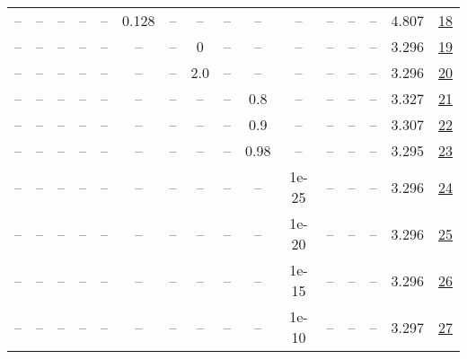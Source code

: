 \begin{table}[H]
\begin{tabular}{cccccccccccccccc}
-- & -- & -- & -- & -- & 0.128 & -- & -- & -- & -- & -- & -- & -- & -- & 4.807 & \href{https://wandb.ai/stanford-mercury/optimizer-scaling/runs/sweep-130m-10B-muonzc9fa46lr0.128-wd0.1-minlr0-warmup0-b10.8-b20-d85c56}{18} \\
-- & -- & -- & -- & -- & -- & -- & 0 & -- & -- & -- & -- & -- & -- & 3.296 & \href{https://wandb.ai/stanford-mercury/optimizer-scaling/runs/sweep-130m-10B-muonz9a2aablr0.008-wd0.1-minlr0-warmup0-b10.8-b20-abe5ba}{19} \\
-- & -- & -- & -- & -- & -- & -- & 2.0 & -- & -- & -- & -- & -- & -- & 3.296 & \href{https://wandb.ai/stanford-mercury/optimizer-scaling/runs/sweep-130m-10B-muonzead85dlr0.008-wd0.1-minlr0-warmup0-b10.8-b20-1fe984}{20} \\
-- & -- & -- & -- & -- & -- & -- & -- & -- & 0.8 & -- & -- & -- & -- & 3.327 & \href{https://wandb.ai/stanford-mercury/optimizer-scaling/runs/sweep-130m-10B-muonz05d5f6lr0.008-wd0.1-minlr0-warmup0-b10.8-b20-643f83}{21} \\
-- & -- & -- & -- & -- & -- & -- & -- & -- & 0.9 & -- & -- & -- & -- & 3.307 & \href{https://wandb.ai/stanford-mercury/optimizer-scaling/runs/sweep-130m-10B-muonz7f2e92lr0.008-wd0.1-minlr0-warmup0-b10.8-b20-4ed3f2}{22} \\
-- & -- & -- & -- & -- & -- & -- & -- & -- & 0.98 & -- & -- & -- & -- & 3.295 & \href{https://wandb.ai/stanford-mercury/optimizer-scaling/runs/sweep-130m-10B-muonzf7964alr0.008-wd0.1-minlr0-warmup0-b10.8-b20-a9a044}{23} \\
-- & -- & -- & -- & -- & -- & -- & -- & -- & -- & 1e-25 & -- & -- & -- & 3.296 & \href{https://wandb.ai/stanford-mercury/optimizer-scaling/runs/sweep-130m-10B-muonzecb6c8lr0.008-wd0.1-minlr0-warmup0-b10.8-b20-bc0c88}{24} \\
-- & -- & -- & -- & -- & -- & -- & -- & -- & -- & 1e-20 & -- & -- & -- & 3.296 & \href{https://wandb.ai/stanford-mercury/optimizer-scaling/runs/sweep-130m-10B-muonzf140a5lr0.008-wd0.1-minlr0-warmup0-b10.8-b20-21ccc0}{25} \\
-- & -- & -- & -- & -- & -- & -- & -- & -- & -- & 1e-15 & -- & -- & -- & 3.296 & \href{https://wandb.ai/stanford-mercury/optimizer-scaling/runs/sweep-130m-10B-muonz9d74d8lr0.008-wd0.1-minlr0-warmup0-b10.8-b20-76b637}{26} \\
-- & -- & -- & -- & -- & -- & -- & -- & -- & -- & 1e-10 & -- & -- & -- & 3.297 & \href{https://wandb.ai/stanford-mercury/optimizer-scaling/runs/sweep-130m-10B-muonzb8dbd0lr0.008-wd0.1-minlr0-warmup0-b10.8-b20-bf5bd6}{27} \\

\end{tabular}
\end{table}
